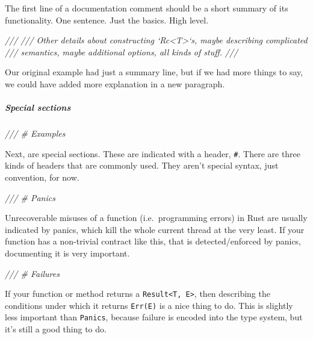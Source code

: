 \documentclass[a4paper,]{book}
\newenvironment{Shaded}{\begin{snugshade}}{\end{snugshade}}
\newcommand{\CommentTok}[1]{\textcolor[rgb]{0.56,0.35,0.01}{\textit{{#1}}}}
\begin{document}
The first line of a documentation comment should be a short summary of
its functionality. One sentence. Just the basics. High level.

\begin{Shaded}
\begin{Highlighting}[]
\CommentTok{///}
\CommentTok{/// Other details about constructing `Rc<T>`s, maybe describing complicated}
\CommentTok{/// semantics, maybe additional options, all kinds of stuff.}
\CommentTok{///}
\end{Highlighting}
\end{Shaded}

Our original example had just a summary line, but if we had more things
to say, we could have added more explanation in a new paragraph.

\subparagraph{Special sections}\label{special-sections}

\begin{Shaded}
\begin{Highlighting}[]
\CommentTok{/// # Examples}
\end{Highlighting}
\end{Shaded}

Next, are special sections. These are indicated with a header,
\texttt{\#}. There are three kinds of headers that are commonly used.
They aren't special syntax, just convention, for now.

\begin{Shaded}
\begin{Highlighting}[]
\CommentTok{/// # Panics}
\end{Highlighting}
\end{Shaded}

Unrecoverable misuses of a function (i.e.~programming errors) in Rust
are usually indicated by panics, which kill the whole current thread at
the very least. If your function has a non-trivial contract like this,
that is detected/enforced by panics, documenting it is very important.

\begin{Shaded}
\begin{Highlighting}[]
\CommentTok{/// # Failures}
\end{Highlighting}
\end{Shaded}

If your function or method returns a
\texttt{Result\textless{}T,\ E\textgreater{}}, then describing the
conditions under which it returns \texttt{Err(E)} is a nice thing to do.
This is slightly less important than \texttt{Panics}, because failure is
encoded into the type system, but it's still a good thing to do.
\end{document}
